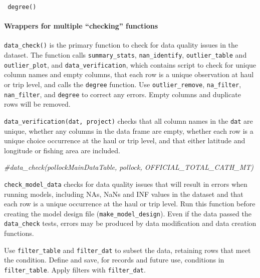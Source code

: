 \documentclass[
]{article}
\newenvironment{Shaded}{\begin{snugshade}}{\end{snugshade}}
\newcommand{\CommentTok}[1]{\textcolor[rgb]{0.56,0.35,0.01}{\textit{#1}}}
\begin{document}
\begin{verbatim}
 degree()            
\end{verbatim}

\hypertarget{wrappers-for-multiple-checking-functions-1}{%
\paragraph{Wrappers for multiple ``checking'' functions}\label{wrappers-for-multiple-checking-functions-1}}

\texttt{data\_check()} is the primary function to check for data quality issues in the dataset. The function calls \texttt{summary\_stats}, \texttt{nan\_identify}, \texttt{outlier\_table} and \texttt{outlier\_plot}, and \texttt{data\_verification}, which contains script to check for unique column names and empty columns, that each row is a unique observation at haul or trip level, and calls the \texttt{degree} function. Use \texttt{outlier\_remove}, \texttt{na\_filter}, \texttt{nan\_filter}, and \texttt{degree} to correct any errors. Empty columns and duplicate rows will be removed.

\texttt{data\_verification(dat,\ project)} checks that all column names in the \texttt{dat} are unique, whether any columns in the data frame are empty, whether each row is a unique choice occurrence at the haul or trip level, and that either latitude and longitude or fishing area are included.

\begin{Shaded}
\begin{Highlighting}[]
\CommentTok{\#data\_check(pollockMainDataTable, \textquotesingle{}pollock\textquotesingle{}, \textquotesingle{}OFFICIAL\_TOTAL\_CATH\_MT\textquotesingle{})}
\end{Highlighting}
\end{Shaded}

\texttt{check\_model\_data} checks for data quality issues that will result in errors when running models, including NAs, NaNs and INF values in the dataset and that each row is a unique occurrence at the haul or trip level. Run this function before creating the model design file (\texttt{make\_model\_design}). Even if the data passed the \texttt{data\_check} tests, errors may be produced by data modification and data creation functions.

Use \texttt{filter\_table} and \texttt{filter\_dat} to subset the data, retaining rows that meet the condition. Define and save, for records and future use, conditions in \texttt{filter\_table}. Apply filters with \texttt{filter\_dat}.
\end{document}
